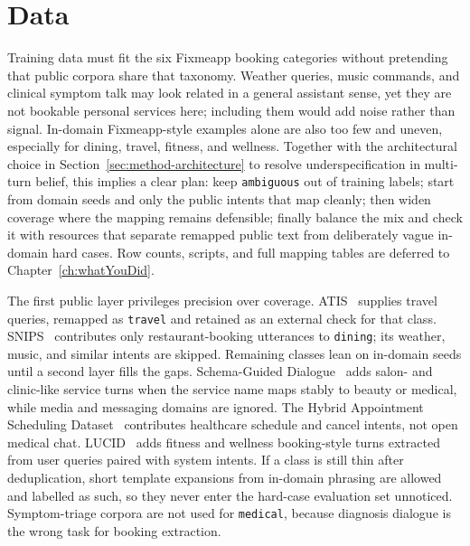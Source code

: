 
\section{Data}
\label{sec:method-data}

Training data must fit the six Fixmeapp booking categories without pretending that public corpora share that taxonomy.
Weather queries, music commands, and clinical symptom talk may look related in a general assistant sense, yet they are not bookable personal services here; including them would add noise rather than signal.
In-domain Fixmeapp-style examples alone are also too few and uneven, especially for dining, travel, fitness, and wellness.
Together with the architectural choice in Section~\ref{sec:method-architecture} to resolve underspecification in multi-turn belief, this implies a clear plan: keep \texttt{ambiguous} out of training labels; start from domain seeds and only the public intents that map cleanly; then widen coverage where the mapping remains defensible; finally balance the mix and check it with resources that separate remapped public text from deliberately vague in-domain hard cases.
Row counts, scripts, and full mapping tables are deferred to Chapter~\ref{ch:whatYouDid}.

The first public layer privileges precision over coverage.
ATIS~\cite{hemphill-etal-1990-atis} supplies travel queries, remapped as \texttt{travel} and retained as an external check for that class.
SNIPS~\cite{coucke_snips_2018} contributes only restaurant-booking utterances to \texttt{dining}; its weather, music, and similar intents are skipped.
Remaining classes lean on in-domain seeds until a second layer fills the gaps.
Schema-Guided Dialogue~\cite{rastogi_sgd_2020} adds salon- and clinic-like service turns when the service name maps stably to beauty or medical, while media and messaging domains are ignored.
The Hybrid Appointment Scheduling Dataset~\cite{hasd_hf} contributes healthcare schedule and cancel intents, not open medical chat.
LUCID~\cite{stacey_lucid_2024} adds fitness and wellness booking-style turns extracted from user queries paired with system intents.
If a class is still thin after deduplication, short template expansions from in-domain phrasing are allowed and labelled as such, so they never enter the hard-case evaluation set unnoticed.
Symptom-triage corpora are not used for \texttt{medical}, because diagnosis dialogue is the wrong task for booking extraction.

